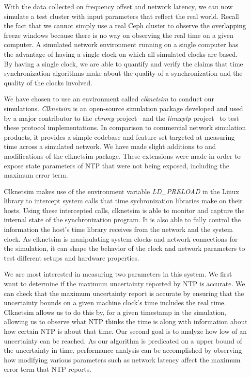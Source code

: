 With the data collected on frequency offset and network latency, we can 
now simulate a test cluster with input parameters that reflect the 
real world. Recall the fact that we cannot simply use a real Ceph
cluster to observe the overlapping freeze windows because there is no
way on observing the real time on a given computer. A
simulated network environment running on a single computer has the
advantage of having a single clock on which all simulated clocks are
based. By having a single clock, we are able to quantify and verify
the claims that time synchronization algorithms make about the quality
of a synchronization and the quality of the clocks involved.


We have chosen to use an environment called \textit{clknetsim} %
to conduct our simulations. \textit{Clknetsim} is an open-source simulation 
package developed and used by a major contributor to the \textit{chrony}
project~\citep{chrony} and the \textit{linuxptp} project~\citep{linuxptp}
to test these protocol implementations. In
comparison to commercial network simulation products, it provides a 
simple codebase and feature set targeted at measuring 
time across a simulated network. We have made slight additions to and
modifications of the clknetsim package. These extensions were made in 
order to expose state parameters of NTP that were not being exposed, 
including the maximum error term.

Clknetsim makes use of the environment variable \textit{LD\_PRELOAD} in
the Linux library to intercept system calls that time sychronization 
libraries make on their hosts. Using these intercepted calls, 
clknetsim is able to monitor and capture the internal state of
the synchronization program. It is also able to fully control the
information the host's time library receives from the network and the system
clock. As clknetsim is manipulating system clocks and network
connections for the simulation, it can shape the behavior of the clock
and network parameters to test different setups and hardware properties. 
        
We are most interested in measuring two parameters in
this system. We first want to determine if the maximum uncertainty
reported by NTP is accurate. We can check that the maximum uncertainty
report is accurate by ensuring that the uncertainty bounds on a given machine
clock's time includes the real time.
Clknetsim allows us to do this by, for a
given timestamp in the simulation, allowing us to observe what NTP
thinks the time is along with information about how certain NTP is
about that time. Our second goal is to analyze how low of an
uncertainty can be reached. As our algorithm is predicated on a upper
bound of the uncertainty in time, performance analysis can be
accomplished by observing how modifying various parameters such as
network latency affect the maximum error term that NTP reports.


